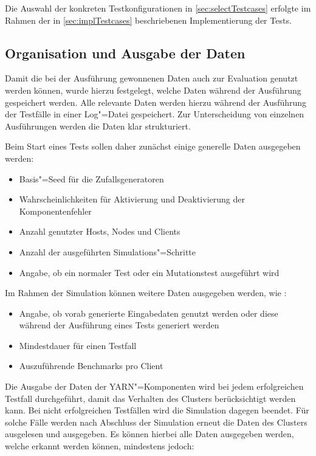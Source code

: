 Die Auswahl der konkreten Testkonfigurationen in \cref{sec:selectTestcases} erfolgte im Rahmen der in \cref{sec:implTestcases} beschriebenen Implementierung der Tests.

\subsection{Organisation und Ausgabe der Daten}
\label{subsec:dataOrganisation}

Damit die bei der Ausführung gewonnenen Daten auch zur Evaluation genutzt werden können, wurde hierzu festgelegt, welche Daten während der Ausführung gespeichert werden.
Alle relevante Daten werden hierzu während der Ausführung der Testfälle in einer Log"=Datei gespeichert.
Zur Unterscheidung von einzelnen Ausführungen werden die Daten klar strukturiert.

Beim Start eines Tests sollen daher zunächst einige generelle Daten ausgegeben werden:

\begin{itemize}
    \item Basis"=Seed für die Zufallsgeneratoren
    \item Wahrscheinlichkeiten für Aktivierung und Deaktivierung der Komponentenfehler
    \item Anzahl genutzter Hosts, Nodes und Clients
    \item Anzahl der ausgeführten Simulations"=Schritte
    \item Angabe, ob ein normaler Test oder ein Mutationstest ausgeführt wird
\end{itemize}

Im Rahmen der Simulation können weitere Daten ausgegeben werden, wie \zB:

\begin{itemize}
    \item Angabe, ob vorab generierte Eingabedaten genutzt werden oder diese während der Ausführung eines Tests generiert werden
    \item Mindestdauer für einen Testfall
    \item Auszuführende Benchmarks pro Client
\end{itemize}

Die Ausgabe der Daten der YARN"=Komponenten wird bei jedem erfolgreichen Testfall durchgeführt, damit das Verhalten des Clusters berücksichtigt werden kann.
Bei nicht erfolgreichen Testfällen wird die Simulation dagegen beendet.
Für solche Fälle werden nach Abschluss der Simulation erneut die Daten des Clusters ausgelesen und ausgegeben.
Es können hierbei alle Daten ausgegeben werden, welche erkannt werden können, mindestens jedoch:


